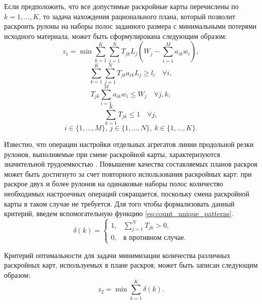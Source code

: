 \documentclass[12pt]{article}
\begin{document}
Если предположить, что все допустимые раскройные карты перечислены по 
$k=1,\ldots,K$, то задача нахождения рационального плана, который позволит 
раскроить рулоны на наборы полос заданного размера с минимальными потерями 
исходного материала, может быть сформулирована следующим образом:
\begin{equation}\label{eq:min_trim_loss}
    z_1=\min{\sum_{k=1}^{K} \sum_{j=1}^{N} T_{jk} L_j 
        \left(W_j-\sum_{i=1}^{M} a_{ik}w_i\right)},
\end{equation}
\begin{equation}\label{eq:orders_are_meet}
     \sum_{k=1}^{K} \sum_{j=1}^{N} T_{jk} a_{ik} L_j \geq l_i \quad \forall i,
\end{equation}
\begin{equation}\label{eq:pattern_feasible}
     T_{jk} \sum_{i=1}^{M} a_{ik} w_i \leq W_j \quad \forall j,k,
\end{equation}
\begin{equation}\label{eq:rolls_cut_once}
     \sum_{k=1}^{K} T_{jk} \leq 1 \quad \forall j,
\end{equation}
\[ i \in \{1,\ldots,M\}, \: j \in \{1,\ldots,N\}, \: k \in \{1,\ldots,K\}.\]

Известно, что операции настройки отдельных агрегатов линии продольной резки 
рулонов, выполняемые при смене раскройной карты, характеризуются значительной 
трудоемкостью \cite{bib:haessler88, bib:song06}. Повышение качества составляемых планов раскроя может 
быть достигнуто за счет повторного использования раскройных карт: при раскрое 
двух и более рулонов на одинаковые наборы полос количество необходимых 
настроечных операций сокращается, поскольку смена раскройной карты в таком 
случае не требуется. Для того чтобы формализовать данный критерий, введем 
вспомогательную функцию 
\eqref{eq:count_unique_patterns}.
\begin{equation}\label{eq:count_unique_patterns}
    \delta\left(k\right)=
        \begin{cases}
            1, & \sum_{j=1}^{N} T_{jk}>0, \\
            0, & \text{в противном случае}.
        \end{cases}    
\end{equation}

Критерий оптимальности для задачи минимизации количества различных раскройных 
карт, используемых в плане раскроя, может быть записан следующим образом:
\begin{equation}\label{eq:min_patterns}
    z_2=\min{\sum_{k=1}^{K}} \delta\left(k\right).
\end{equation}
\end{document}

